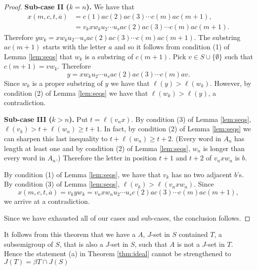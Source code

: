 \begin{proof}
  \textbf{Sub-case II ($k = n$).}
  We have that
  \begin{align*}
    x(m, c, t, \overline{a}) &= c(1)ac(2)ac(3) \cdots c(m)ac(m+1), \\
                             &= v_kxw_ku_2 \cdots u_sac(2)ac(3) \cdots c(m)ac(m+1).
  \end{align*}
  Therefore $yw_k = xw_ku_2 \cdots u_sac(2)ac(3) \cdots c(m)ac(m+1)$. 
  The substring $ac(m+1)$ starts with the letter $a$ and so it follows from condition (1) of Lemma \ref{lem:seqs} that $w_k$ is a substring of $c(m+1)$.
  Pick $v \in S \cup \{\emptyset\}$ such that $c(m+1) = vw_k$. 
  Therefore 
  \[
    y = xw_ku_2 \cdots u_sac(2)ac(3) \cdots c(m)av.
  \]
  Since $w_k$ is a proper substring of $y$ we have that $\ell(y) > \ell(w_k)$.
  However, by condition (2) of Lemma \ref{lem:seqs} we have that $\ell(w_k) > \ell(y)$, a contradiction. 

  \textbf{Sub-case III ($k > n$).}
  Put $t = \ell(v_nx)$.
  By condition (3) of Lemma \ref{lem:seqs}, $\ell(v_k) > t + \ell(w_n) \ge t+1$.
  In fact, by condition (2) of Lemma \ref{lem:seqs} we can sharpen this last inequality to $t + \ell(w_n) \ge t+2$.
  (Every word in $A_n$ has length at least one and by condition (2) of Lemma \ref{lem:seqs}, $w_n$ is longer than every word in $A_n$.)
  Therefore the letter in position $t+1$ and $t+2$ of $v_nxw_n$ is $b$. 

  By condition (1) of Lemma \ref{lem:seqs}, we have that $v_k$ has no two adjacent $b$'s. 
  By condition (3) of Lemma \ref{lem:seqs}, $\ell(v_k) > \ell(v_nxw_n)$. 
  Since 
  \[
    x(m, c, t, \overline{a}) = v_kyw_k = v_nxw_nu_2 \cdots u_sc(2) ac(3)\cdots c(m)ac(m+1),
  \]
  we arrive at a contradiction.

  Since we have exhausted all of our cases and sub-cases, the conclusion follows.
\end{proof}

It follows from this theorem that we have a $A$, $J$-set in $S$ contained $T$, a subsemigroup of $S$, that is also a $J$-set in $S$, such that $A$ is not a $J$-set in $T$.
Hence the statement (a) in Theorem \ref{thm:ideal} cannot be strengthened to $J(T) = \beta T \cap J(S)$ 